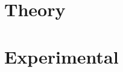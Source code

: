 \documentclass[11pt, rgb]{scrreprt}
\begin{document}
\listoftables
{}




%
%
%
%



\normalsize

\newpage






\chapter{Theory}
\label{cha:theory}




\chapter{Experimental}
\label{cha:experimental}
\end{document}
